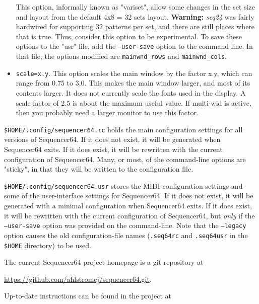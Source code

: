 \begin{itemize}
            This option, informally known as "variset", allow some changes in
            the set size and layout from the default 4x8 = 32 sets layout.
            \textbf{Warning:}
            \textsl{seq24} was fairly hardwired for supporting 32 patterns per
            set, and there are still places where that is true.  Thus,
            consider this option to be experimental.
            To save these options to the "usr" file, add the
            \texttt{--user-save} option to the command line.
            In that file, the options modified are \texttt{mainwnd\_rows} and
            \texttt{mainwnd\_cols}.
         \item \texttt{scale=x.y}.
            This option scales the main window by the factor x.y, which can
            range from 0.75 to 3.0.  This makes the main window larger, and
            most of its contents larger.  It does not currently scale the
            fonts used in the display.  A scale factor of 2.5 is about the
            maximum useful value.  If multi-wid is active, then you probably
            need a larger monitor to use this factor.
      \end{itemize}

   \texttt{\$HOME/.config/sequencer64.rc} holds the main configuration settings
   for all versions of Sequencer64.  If it does not exist, it will be generated
   when Sequencer64 exits.  If it does exist, it will be rewritten with the
   current configuration of Sequencer64.  Many, or most, of the command-line
   options are "sticky", in that they will be written to the configuration
   file.

   \texttt{\$HOME/.config/sequencer64.usr} stores the MIDI-configuration
   settings and some of the user-interface settings for Sequencer64.  If it
   does not exist, it will be generated with a minimal configuration when
   Sequencer64 exits.  If it does exist, it will be rewritten with the current
   configuration of Sequencer64, but \textsl{only} if the
   \texttt{--user-save} option was provided on the command-line.
   Note that the
   \texttt{--legacy} option causes the old
   configuration-file names (\texttt{.seq64rc} and \texttt{.seq64usr}
   in the \texttt{\$HOME} directory)
   to be used.

   The current Sequencer64 project homepage is a git repository at

   \url{https://github.com/ahlstromcj/sequencer64.git}.

   Up-to-date instructions can be found in the project at

